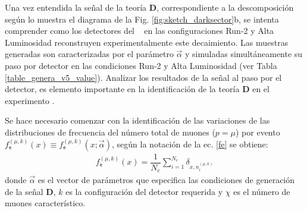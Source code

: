 
Una vez entendida la señal de la teoría \MSSM\textbf{D}, correspondiente a la descomposición según lo muestra el diagrama de la Fig. \ref{fig:sketch_darksector}b, se intenta comprender como los detectores del \CMS ~ en las configuraciones Run-2 y Alta Luminosidad reconstruyen experimentalmente este decaimiento. Las muestras generadas son caracterizadas por el parámetro $\vec{\alpha}$ y simuladas simultáneamente su paso por detector en las condiciones Run-2 y Alta Luminosidad (ver Tabla \ref{table_genera_v5_value}). Analizar los resultados de la señal al paso por el detector, es elemento importante en la identificación de la teoría \MSSM\textbf{D} en el experimento \CMS.


Se hace necesario comenzar con la identificación de las variaciones de las distribuciones de frecuencia del número total de muones ($p=\mu$) por evento $f^{(\mu, k)}_\textsf{e} (x) \equiv f^{(\mu, k)}_\textsf{e} (x; \vec{\alpha})$, según la notación de la ec. \ref{fe} se obtiene:
\begin{eqnarray}
f^{(\mu, k)}_\textsf{e} (x) = \dfrac{1}{N_e}\sum_{i=1}^{N_e} \delta_{x, n_i^{(\mu,k)}}
\end{eqnarray}
donde $\vec{\alpha}$ es el vector de parámetros que especifica las condiciones de generación de la señal \MSSM\textbf{D}, $k$ es la configuración del detector requerida y $\chi$ es el número de muones característico.

